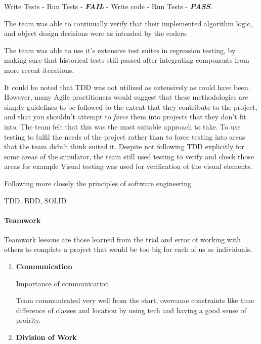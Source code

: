 \documentclass[11pt]{article}
\begin{document}
\begin{enumerate}
	Write Tests - Run Tests - \textbf {\textit{FAIL}} - Write code - Run Tests - \textbf {\textit{PASS}}. 
	
	The team was able to continually verify that their implemented algorithm logic, and object design decisions were as intended by the coders.
	
	The team was able to use it's extensive test suites in regression testing, by making sure that historical tests still passed after integrating components from more recent iterations.
	
	It could be noted that TDD was not utilized as extensively as could have been. However, many Agile practitioners would suggest that these methodologies are simply guidelines to be followed to the extent that they contribute to the project, and that you shouldn't attempt to \textit{force} them into projects that they don't fit into. The team felt that this was the most suitable approach to take. To use testing to fulfil the needs of the project rather than to force testing into areas that the team didn't think suited it. Despite not following TDD explicitly for some areas of the simulator, the team still used testing to verify and check those areas for example Visual testing was used for verification of the visual elements.
	
	
	Following more closely the principles of software engineering
	
	TDD, BDD, SOLID 
	
	
\end{enumerate}

\paragraph{Teamwork}

Teamwork lessons are those learned from the trial and error of working with others to complete a project that would be too big for each of us as individuals.

\begin{enumerate}
	
	\item \textbf{Communication}
	
	Importance of communication
	
	Team communicated very well from the start, overcame constraints like time difference of classes and location by using tech and having a good sense of proirity.
	
	\item \textbf{Division of Work}
	
	
	
	
\end{enumerate}
\end{document}
